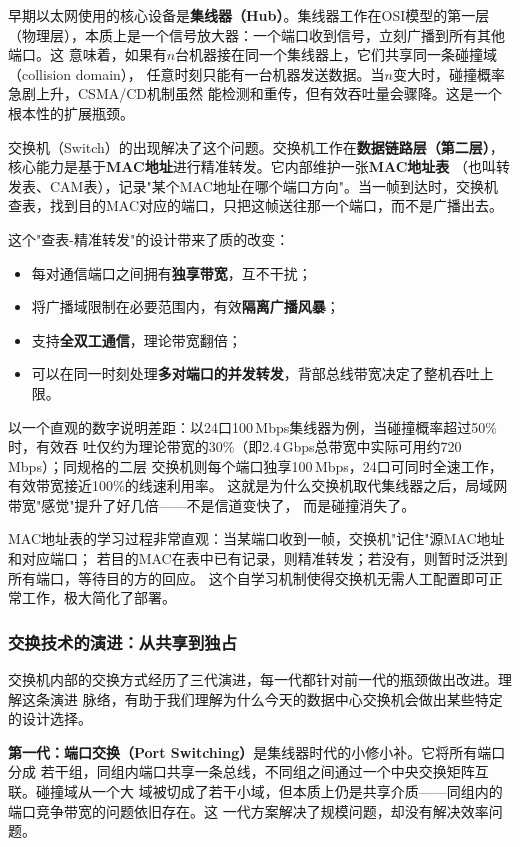早期以太网使用的核心设备是\textbf{集线器（Hub）}。集线器工作在OSI模型的第一层
（物理层），本质上是一个信号放大器：一个端口收到信号，立刻广播到所有其他端口。这
意味着，如果有$n$台机器接在同一个集线器上，它们共享同一条碰撞域（collision domain），
任意时刻只能有一台机器发送数据。当$n$变大时，碰撞概率急剧上升，CSMA/CD机制虽然
能检测和重传，但有效吞吐量会骤降。这是一个根本性的扩展瓶颈。

交换机（Switch）的出现解决了这个问题。交换机工作在\textbf{数据链路层（第二层）}，
核心能力是基于\textbf{MAC地址}进行精准转发。它内部维护一张\textbf{MAC地址表}
（也叫转发表、CAM表），记录"某个MAC地址在哪个端口方向"。当一帧到达时，交换机
查表，找到目的MAC对应的端口，只把这帧送往那一个端口，而不是广播出去。

这个"查表-精准转发"的设计带来了质的改变：
\begin{itemize}
  \item 每对通信端口之间拥有\textbf{独享带宽}，互不干扰；
  \item 将广播域限制在必要范围内，有效\textbf{隔离广播风暴}；
  \item 支持\textbf{全双工通信}，理论带宽翻倍；
  \item 可以在同一时刻处理\textbf{多对端口的并发转发}，背部总线带宽决定了整机吞吐上限。
\end{itemize}

以一个直观的数字说明差距：以24口100\,Mbps集线器为例，当碰撞概率超过50\%时，有效吞
吐仅约为理论带宽的30\%（即2.4\,Gbps总带宽中实际可用约720\,Mbps）；同规格的二层
交换机则每个端口独享100\,Mbps，24口可同时全速工作，有效带宽接近100\%的线速利用率。
这就是为什么交换机取代集线器之后，局域网带宽"感觉"提升了好几倍——不是信道变快了，
而是碰撞消失了。

MAC地址表的学习过程非常直观：当某端口收到一帧，交换机"记住"源MAC地址和对应端口；
若目的MAC在表中已有记录，则精准转发；若没有，则暂时泛洪到所有端口，等待目的方的回应。
这个自学习机制使得交换机无需人工配置即可正常工作，极大简化了部署。

\subsubsection{交换技术的演进：从共享到独占}

交换机内部的交换方式经历了三代演进，每一代都针对前一代的瓶颈做出改进。理解这条演进
脉络，有助于我们理解为什么今天的数据中心交换机会做出某些特定的设计选择。

\textbf{第一代：端口交换（Port Switching）}是集线器时代的小修小补。它将所有端口分成
若干组，同组内端口共享一条总线，不同组之间通过一个中央交换矩阵互联。碰撞域从一个大
域被切成了若干小域，但本质上仍是共享介质——同组内的端口竞争带宽的问题依旧存在。这
一代方案解决了规模问题，却没有解决效率问题。

